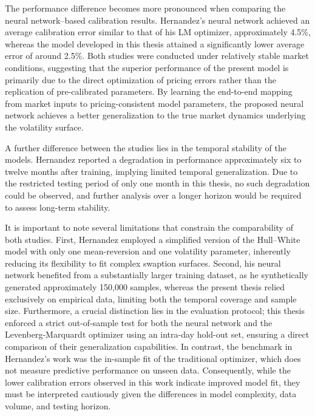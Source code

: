 The performance difference becomes more pronounced when comparing the neural network–based calibration results. Hernandez’s neural network achieved an average calibration error similar to that of his LM optimizer, approximately 4.5\%, whereas the model developed in this thesis attained a significantly lower average error of around 2.5\%. Both studies were conducted under relatively stable market conditions, suggesting that the superior performance of the present model is primarily due to the direct optimization of pricing errors rather than the replication of pre-calibrated parameters. By learning the end-to-end mapping from market inputs to pricing-consistent model parameters, the proposed neural network achieves a better generalization to the true market dynamics underlying the volatility surface.

A further difference between the studies lies in the temporal stability of the models. Hernandez reported a degradation in performance approximately six to twelve months after training, implying limited temporal generalization. Due to the restricted testing period of only one month in this thesis, no such degradation could be observed, and further analysis over a longer horizon would be required to assess long-term stability.

It is important to note several limitations that constrain the comparability of both studies. First, Hernandez employed a simplified version of the Hull--White model with only one mean-reversion and one volatility parameter, inherently reducing its flexibility to fit complex swaption surfaces. Second, his neural network benefited from a substantially larger training dataset, as he synthetically generated approximately 150,000 samples, whereas the present thesis relied exclusively on empirical data, limiting both the temporal coverage and sample size. Furthermore, a crucial distinction lies in the evaluation protocol; this thesis enforced a strict out-of-sample test for both the neural network and the Levenberg-Marquardt optimizer using an intra-day hold-out set, ensuring a direct comparison of their generalization capabilities. In contrast, the benchmark in Hernandez's work was the in-sample fit of the traditional optimizer, which does not measure predictive performance on unseen data. Consequently, while the lower calibration errors observed in this work indicate improved model fit, they must be interpreted cautiously given the differences in model complexity, data volume, and testing horizon.
